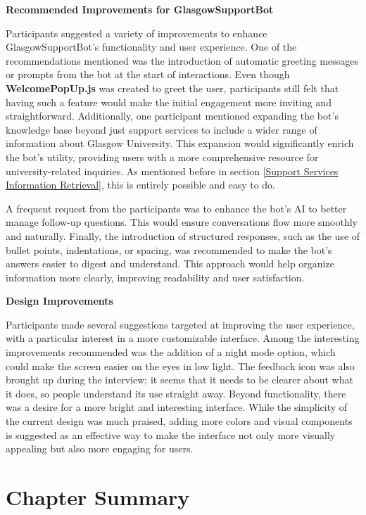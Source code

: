 \documentclass{l4proj}
\begin{document}
\textbf{Recommended Improvements for GlasgowSupportBot}


Participants suggested a variety of improvements to enhance GlasgowSupportBot's functionality and user experience. One of the recommendations mentioned was the introduction of automatic greeting messages or prompts from the bot at the start of interactions. Even though \textbf{WelcomePopUp.js} was created to greet the user, participants still felt that having such a feature would make the initial engagement more inviting and straightforward. Additionally, one participant mentioned expanding the bot's knowledge base beyond just support services to include a wider range of information about Glasgow University. This expansion would significantly enrich the bot's utility, providing users with a more comprehensive resource for university-related inquiries. As mentioned before in section \ref{Support Services Information Retrieval}, this is entirely possible and easy to do.

A frequent request from the participants was to enhance the bot's AI to better manage follow-up questions. This would ensure conversations flow more smoothly and naturally. Finally, the introduction of structured responses, such as the use of bullet points, indentations, or spacing, was recommended to make the bot's answers easier to digest and understand. This approach would help organize information more clearly, improving readability and user satisfaction.

\textbf{Design Improvements}

Participants made several suggestions targeted at improving the user experience, with a particular interest in a more customizable interface. Among the interesting improvements recommended was the addition of a night mode option, which could make the screen easier on the eyes in low light. The feedback icon was also brought up during the interview; it seems that it needs to be clearer about what it does, so people understand its use straight away. Beyond functionality, there was a desire for a more bright and interesting interface. While the simplicity of the current design was much praised, adding more colors and visual components is suggested as an effective way to make the interface not only more visually appealing but also more engaging for users.


\section{Chapter Summary}
\end{document}
